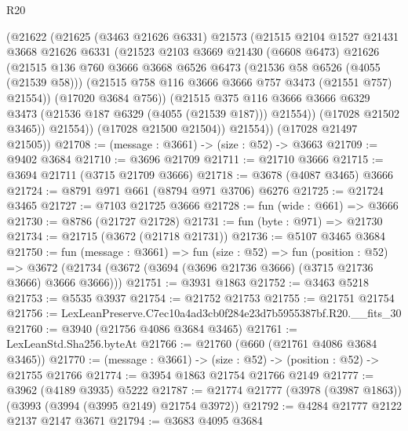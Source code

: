 \begin{lexlean}{R20}
\begin{coremodule}
              (@21622
                (@21625
                  (@3463 @21626 @6331)
                  @21573
                  (@21515
                    @2104
                    @1527
                    @21431
                    @3668
                    @21626
                    @6331
                    (@21523
                      @2103
                      @3669
                      @21430
                      (@6608 @6473)
                      @21626
                      (@21515
                        @136
                        @760
                        @3666
                        @3668
                        @6526
                        @6473
                        (@21536 @58 @6526 (@4055 (@21539 @58)))
                        (@21515 @758 @116 @3666 @3666 @757 @3473 (@21551 @757) @21554))
                      (@17020 @3684 @756))
                    (@21515
                      @375
                      @116
                      @3666
                      @3666
                      @6329
                      @3473
                      (@21536 @187 @6329 (@4055 (@21539 @187)))
                      @21554))
                  (@17028 @21502 @3465))
                @21554))
            (@17028 @21500 @21504))
          @21554))
      (@17028 @21497 @21505))
@21708 := (message : @3661) -> (size : @52) -> @3663
@21709 := @9402 @3684
@21710 := @3696 @21709
@21711 := @21710 @3666
@21715 := @3694 @21711 (@3715 @21709 @3666)
@21718 := @3678 (@4087 @3465) @3666
@21724 := @8791 @971 @661 (@8794 @971 @3706) @6276
@21725 := @21724 @3465
@21727 := @7103 @21725 @3666
@21728 := fun (wide : @661) => @3666
@21730 := @8786 (@21727 @21728)
@21731 := fun (byte : @971) => @21730
@21734 := @21715 (@3672 (@21718 @21731))
@21736 := @5107 @3465 @3684
@21750 := fun (message : @3661) =>
  fun (size : @52) =>
  fun (position : @52) =>
  @3672 (@21734 (@3672 (@3694 (@3696 @21736 @3666) (@3715 @21736 @3666) @3666 @3666)))
@21751 := @3931 @1863
@21752 := @3463 @5218
@21753 := @5535 @3937
@21754 := @21752 @21753
@21755 := @21751 @21754
@21756 := LexLeanPreserve.C7ec10a4ad3cb0f284e23d7b5955387bf.R20.__fits_30
@21760 := @3940 (@21756 @4086 @3684 @3465)
@21761 := LexLeanStd.Sha256.byteAt
@21766 := @21760 (@660 (@21761 @4086 @3684 @3465))
@21770 := (message : @3661) -> (size : @52) -> (position : @52) -> @21755 @21766
@21774 := @3954 @1863 @21754 @21766 @2149
@21777 := @3962 (@4189 @3935) @5222
@21787 := @21774 @21777 (@3978 (@3987 @1863)) (@3993 (@3994 (@3995 @2149) @21754 @3972))
@21792 := @4284 @21777 @2122 @2137 @2147 @3671
@21794 := @3683 @4095 @3684

\end{coremodule}
\end{lexlean}
